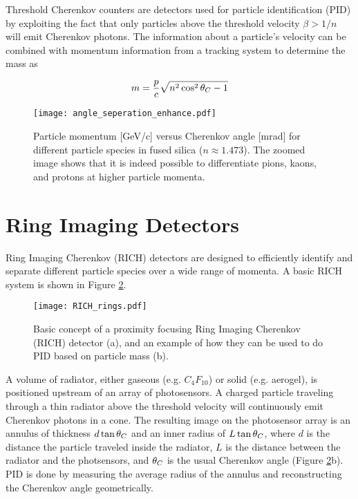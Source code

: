 Threshold Cherenkov counters are detectors used for particle identification (PID) by exploiting the fact that only particles above the threshold velocity $\beta > 1/n$ will emit Cherenkov photons. The information about a particle's velocity can be combined with momentum information from a tracking system to determine the mass as \cite{ParticleDetectionHandbook}

\begin{equation}
	m = \frac{p}{c} \sqrt{n^2 \cos^2\theta_{C} - 1}
	\label{eq:mass}
\end{equation}

\begin{figure}[ht]
	\centering
	\texttt{[image: angle\_seperation\_enhance.pdf]}
	\caption{Particle momentum [GeV/c] versus Cherenkov angle [mrad] for different particle species in fused silica ($n \approx 1.473$). The zoomed image shows that it is indeed possible to differentiate pions, kaons, and protons at higher particle momenta.}
	\label{fig:angleseperation}
\end{figure}

\section{Ring Imaging Detectors}
Ring Imaging Cherenkov (RICH) detectors are designed to efficiently identify and separate different particle species over a wide range of momenta. A basic RICH system is shown in Figure \ref{fig:rich_basics}. 

\begin{figure}[ht]
	\centering
	\texttt{[image: RICH\_rings.pdf]}
	\caption{Basic concept of a proximity focusing Ring Imaging Cherenkov (RICH) detector (a), and an example of how they can be used to do PID based on particle mass (b).}
	\label{fig:rich_basics}
\end{figure}

A volume of radiator, either gaseous (e.g. $C_{4}F_{10}$) or solid (e.g. aerogel), is positioned upstream of an array of photosensors. A charged particle traveling through a thin radiator above the threshold velocity will continuously emit Cherenkov photons in a cone. The resulting image on the photosensor array is an annulus of thickness $d\tan\theta_{C}$ and an inner radius of $L\tan\theta_{C}$, where $d$ is the distance the particle traveled inside the radiator, $L$ is the distance between the radiator and the photsensors, and  $\theta_{C}$ is the usual Cherenkov angle (Figure \ref{fig:rich_basics}b). PID is done by measuring the average radius of the annulus and reconstructing the Cherenkov angle geometrically.


